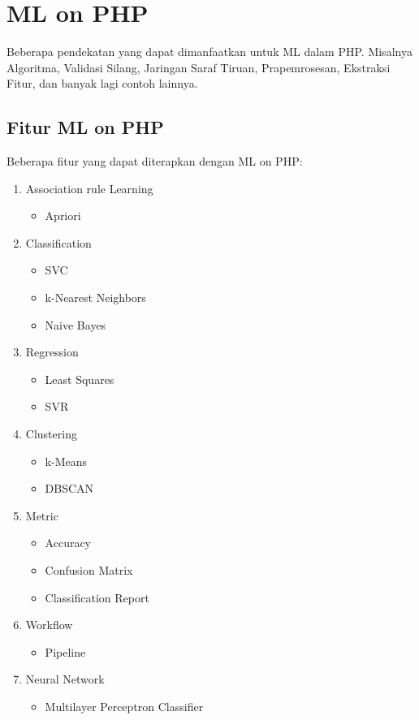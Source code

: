\section{ML on PHP}
\par Beberapa pendekatan yang dapat dimanfaatkan  untuk ML dalam PHP. Misalnya Algoritma, Validasi Silang, Jaringan Saraf Tiruan, Pra\-pemrosesan, Ekstraksi Fitur, dan banyak lagi contoh lainnya.

\subsection{Fitur ML on PHP}
Beberapa fitur yang dapat diterapkan dengan ML on PHP:
\begin{enumerate}
\item Association rule Learning
\begin{itemize}
\item Apriori
\end{itemize}
\item Classification
\begin{itemize}
\item SVC
\item k-Nearest Neighbors
\item Naive Bayes
\end{itemize}
\item Regression
\begin{itemize}
\item Least Squares
\item SVR
\end{itemize}
\item Clustering
\begin{itemize}
\item k-Means
\item DBSCAN
\end{itemize}
\item Metric
\begin{itemize}
\item Accuracy
\item Confusion Matrix
\item  Classification Report
\end{itemize}
\item Workflow
\begin{itemize}
\item  Pipeline
\end{itemize}
\item Neural Network
\begin{itemize}
\item Multilayer Perceptron Classifier

\end{itemize}
\end{enumerate}
